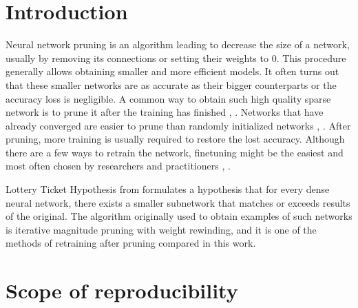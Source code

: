 \section{Introduction}

Neural network pruning is an algorithm leading to decrease the size of a network, usually by removing its connections or setting their weights to 0. 
This procedure generally allows obtaining smaller and more efficient models.
It often turns out that these smaller networks are as accurate as their bigger counterparts or the accuracy loss is negligible.
A common way to obtain such high quality sparse network is to prune it after the training has finished \cite{rethinking}, \cite{Frankle}.
Networks that have already converged are easier to prune than randomly initialized networks \cite{rethinking}, \cite{snip}.
After pruning, more training is usually required to restore the lost accuracy.
Although there are a few ways to retrain the network, finetuning might be the easiest and most often chosen by researchers and practitioners \cite{rethinking}, \cite{Renda}.

Lottery Ticket Hypothesis from \cite{Frankle} formulates a hypothesis that for every dense neural network, there exists a smaller subnetwork that matches or exceeds results of the original. The algorithm originally used to obtain examples of such networks is iterative magnitude pruning with weight rewinding, and it is one of the methods of retraining after pruning compared in this work.


\section{Scope of reproducibility}
\label{sec:claims}



